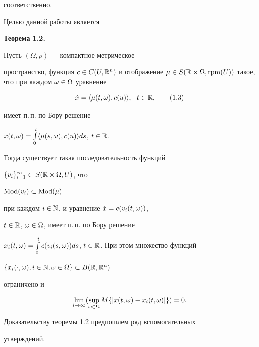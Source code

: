 соответственно.


\medskip





Целью данной работы является


\medskip





{\bf Теорема 1.2.} {\it


Пусть $(\Omega,\rho)$ --- компактное метрическое


пространство, функция $c\in C(U,\Bbb R^n)$ и отображение $\mu\in


S(\Bbb R\times\Omega,\rpm(U))$ такое, что при каждом $\mm$ уравнение


\begin{equation}


\Dot x=\la


\mu(t,\omega),c(u)\ra,\ \ t\in \Bbb R,\tag{1.3}


\end{equation}


имеет п.\,п. по Бору решение


$x(t,\omega)=\int\limits_0^t\langle\mu(s,\omega),c(u)\rangle ds$, $t\in \Bbb R$.


Тогда существует такая последовательность функций


$\{v_i\}_{i=1}^{\infty}\subset S(\Bbb R\times\Omega,U)$, что


${\operatorname{Mod}}(v_i)\subset {\operatorname{Mod}}(\mu)$


при каждом $i\in \Bbb N$, и уравнение $\Dot x=c(v_i(t,\omega))$,


$t\in \Bbb R$, $\omega\in\Omega$, имеет п.\,п. по Бору решение


$x_i\tm=\int\limits_0^t


c(v_i(s,\omega))ds$, $t\in\Bbb R$. При этом множество функций


$\{x_{i}(\cdot,\omega), i\in\Bbb N, \omega\in\Omega\}


\subset B(\Bbb R,\Bbb R^{n})$


ограничено и


}


$$


\lim\limits_{i\to\infty}(\sup_{\mm} M\{|x\tm-x_i\tm|\})=0.


$$





Доказательству теоремы 1.2 предпошлем ряд вспомогательных


утверждений.


